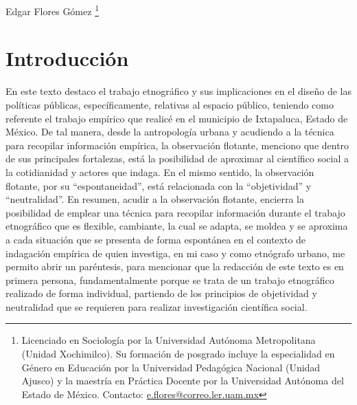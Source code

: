 \documentclass[
  spanish,
  11pt,
  a4paper,
]{scrbook}
\begin{document}

\begin{flushright}
\Large Edgar Flores Gómez \footnote{Licenciado en Sociología por la Universidad Autónoma Metropolitana (Unidad Xochimilco). Su formación de posgrado incluye la especialidad en Género en Educación por la Universidad Pedagógica Nacional (Unidad Ajusco) y la maestría en Práctica Docente por la Universidad Autónoma del Estado de México. Contacto: \href{e.flores@correo.ler.uam.mx}{e.flores@correo.ler.uam.mx}}
\end{flushright}

\section*{Introducción}\label{introducciuxf3n-5}


En este texto destaco el trabajo etnográfico y sus implicaciones en el
diseño de las políticas públicas, específicamente, relativas al espacio
público, teniendo como referente el trabajo empírico que realicé en el
municipio de Ixtapaluca, Estado de México. De tal manera, desde la
antropología urbana y acudiendo a la técnica para recopilar información
empírica, la observación flotante, menciono que dentro de sus
principales fortalezas, está la posibilidad de aproximar al científico
social a la cotidianidad y actores que indaga. En el mismo sentido, la
observación flotante, por su ``espontaneidad'', está relacionada con la
``objetividad'' y ``neutralidad''. En resumen, acudir a la observación
flotante, encierra la posibilidad de emplear una técnica para recopilar
información durante el trabajo etnográfico que es flexible, cambiante,
la cual se adapta, se moldea y se aproxima a cada situación que se
presenta de forma espontánea en el contexto de indagación empírica de
quien investiga, en mi caso y como etnógrafo urbano, me permito abrir un
paréntesis, para mencionar que la redacción de este texto es en primera
persona, fundamentalmente porque se trata de un trabajo etnográfico
realizado de forma individual, partiendo de los principios de
objetividad y neutralidad que se requieren para realizar investigación
científica social.
\end{document}
